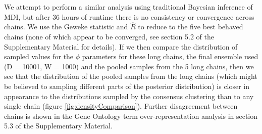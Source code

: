 \documentclass{bmcart}
\begin{document}

We attempt to perform a similar analysis using traditional Bayesian inference of MDI, but after 36 hours of runtime there is no consistency or convergence across chains.  We use the Geweke statistic and $\hat{R}$ to reduce to the five best behaved chains (none of which appear to be converged, see section 5.2 of the Supplementary Material for details). If we then compare the distribution of sampled values for the $\phi$ parameters for these long chains, the final ensemble used (D = 10001, W = 1000) and the pooled samples from the 5 long chains, then we see that the distribution of the pooled samples from the long chains (which might be believed to sampling different parts of the posterior distribution) is closer in appearance to the distributions sampled by the consensus clustering than to any single chain (figure \ref{fig:densityComparison}). Further disagreement between chains is shown in the Gene Ontology term over-representation analysis in section 5.3 of the Supplementary Material.
\end{document}

